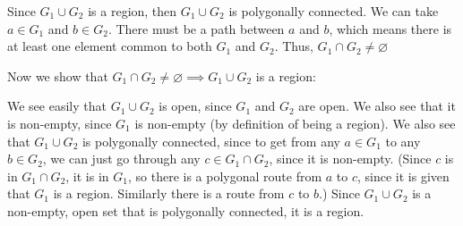 \begin{enumerate}
Since $G_1 \cup G_2$ is a region, then $G_1 \cup G_2$ is polygonally connected. We can take $a \in G_1$ and $b \in G_2$. There must be a path between $a$ and $b$, which means there is at least one element common to both $G_1$ and $G_2$. Thus, $G_1 \cap G_2 \ne \varnothing$

Now we show that  $G_1 \cap G_2 \ne \varnothing \implies G_1 \cup G_2$ is a region:

We see easily that $G_1 \cup G_2$ is open, since $G_1$ and $G_2$ are open. We also see that it is non-empty, since $G_1$ is non-empty (by definition of being a region). We also see that $G_1 \cup G_2$ is polygonally connected, since to get from any $a \in G_1$ to any $b \in G_2$, we can just go through any $c \in G_1 \cap G_2$, since it is non-empty. (Since $c$ is in $G_1 \cap G_2$, it is in $G_1$, so there is a polygonal route from $a$ to $c$, since it is given that $G_1$ is a region. Similarly there is a route from $c$ to $b$.) Since $G_1 \cup G_2$ is a non-empty, open set that is polygonally connected, it is a region. 


\end{enumerate}
